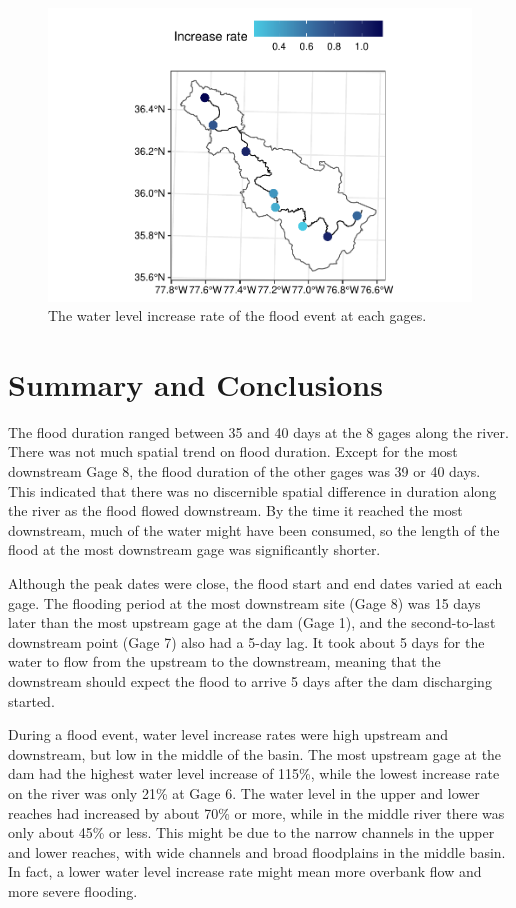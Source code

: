 \documentclass[12pt,]{article}
\begin{document}
\begin{figure}
\centering
\includegraphics{Zeng_WDA_Project_files/figure-latex/Figure 7-1.pdf}
\caption{The water level increase rate of the flood event at each
gages.}
\end{figure}

\newpage

\section{Summary and Conclusions}\label{summary-and-conclusions}

The flood duration ranged between 35 and 40 days at the 8 gages along
the river. There was not much spatial trend on flood duration. Except
for the most downstream Gage 8, the flood duration of the other gages
was 39 or 40 days. This indicated that there was no discernible spatial
difference in duration along the river as the flood flowed downstream.
By the time it reached the most downstream, much of the water might have
been consumed, so the length of the flood at the most downstream gage
was significantly shorter.

Although the peak dates were close, the flood start and end dates varied
at each gage. The flooding period at the most downstream site (Gage 8)
was 15 days later than the most upstream gage at the dam (Gage 1), and
the second-to-last downstream point (Gage 7) also had a 5-day lag. It
took about 5 days for the water to flow from the upstream to the
downstream, meaning that the downstream should expect the flood to
arrive 5 days after the dam discharging started.

During a flood event, water level increase rates were high upstream and
downstream, but low in the middle of the basin. The most upstream gage
at the dam had the highest water level increase of 115\%, while the
lowest increase rate on the river was only 21\% at Gage 6. The water
level in the upper and lower reaches had increased by about 70\% or
more, while in the middle river there was only about 45\% or less. This
might be due to the narrow channels in the upper and lower reaches, with
wide channels and broad floodplains in the middle basin. In fact, a
lower water level increase rate might mean more overbank flow and more
severe flooding.
\end{document}
